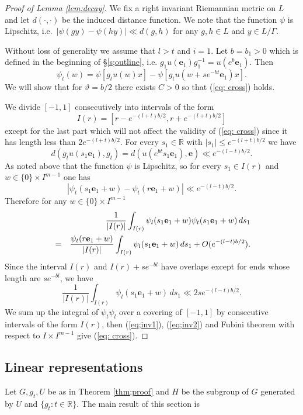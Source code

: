 \documentclass[12pt]{amsart}
\theoremstyle{definition}
\theoremstyle{remark}
\numberwithin{equation}{section}
\begin{document}
\begin{proof}[Proof of Lemma \ref{lem;decay}]

 We fix a right invariant Riemannian metric on $L$
and let $d(\cdot, \cdot)$ be the induced  distance function.
We note that the function  $\psi $ is Lipschitz, 
i.e.~$|\psi(gy)-\psi(hy)|\ll d(g, h) $ for any $g, h\in L$ and $y\in L/\Gamma$. 

Without loss of generality we assume that $l>t$ and $i=1$.
 Let 
 $b=b_1>0$ which is defined in the beginning of \S \ref{s;outline}, i.e. 
$
 {g_1}u(\mathbf e_1) g_1^{-1}=u(e^b\mathbf e_1).
$
Then 
\[
\psi_t(w)=\psi[g_tu(w)x]-\psi[g_tu(w+se^{-bt }\mathbf e_1)x].
\]
We will show that for $\vartheta=b/2$ there exists $C>0$ so that (\ref{eq: cross}) holds.

 We divide $[-1, 1]$ consecutively  into intervals of 
the form 
\[
I(r)=[r-e^{-(l+t)b/2}, r+e^{-(l+t)b/2}]
\]
except for the last part which will not affect the validity of (\ref{eq: cross})
since it has length  
less than $2e^{-(l+t)b/2}$.
For every $s_1\in \mathbb R$ with $|s_1|\le e^{-(l+t)b/2}$
we have
 \[
d(g_tu(s_1 \mathbf e_1),g_t)=d(u(e^{bt}s_1\mathbf e_1), \mathbf e)\ll e^{-(l-t)b/2}.
\]
As noted above that the function $\psi$ is Lipschitz,
so for every 
$s_1\in I(r)$ and 
$w\in \{0\}\times I^{m-1}$
 one has
\[
|\psi_t(s_1\mathbf e_1+w)-\psi_t(r\mathbf e_1+w)|\ll e^{-(l-t)b/2}.
\]
Therefore for any $w\in \{0\}\times I^{m-1}$
 \begin{eqnarray}\label{eq;inv1}
  & &\frac{1}{|I(r)|}\int_{I(r)} \psi_l(s_1\mathbf e_1+w)\psi_t(s_1\mathbf e_1+w)\, ds_1  \\
 & =&\frac{\psi_t(r\mathbf e_1+w)}{|I(r)|}
\int_{I(r)}\psi_l (s_1\mathbf e_1+w)\, ds_1 + O(e^{-(l-t)b/2}).\notag
\end{eqnarray}
Since the interval $I(r)$ and $I(r)+se^{-bl}$ have overlaps except for ends whose   length 
are $se^{-bl}$,
we have 
\begin{equation}\label{eq;inv2}
\frac{1}{|I(r)|}
\int_{I(r)}\psi_l (s_1\mathbf e_1+w)\, ds_1\ll 2se^{-(l-t)b/2}.
\end{equation}
We sum up the integral of $\psi_t\psi_l$ over a covering of $[-1,1]$ by consecutive intervals of the form $I(r)$, then 
(\ref{eq;inv1}), (\ref{eq;inv2}) and Fubini theorem with respect to $I\times I^{m-1}$ give  (\ref{eq: cross}).
\end{proof}

\subsection{Linear representations}
Let $ G, g_t, U$ be   as  in Theorem \ref{thm;proof}
and  $H$ be the subgroup  of $G$ generated by $U$ and $\{ g_t: t\in \mathbb R\}$.  The main result of this section is
\end{document}
